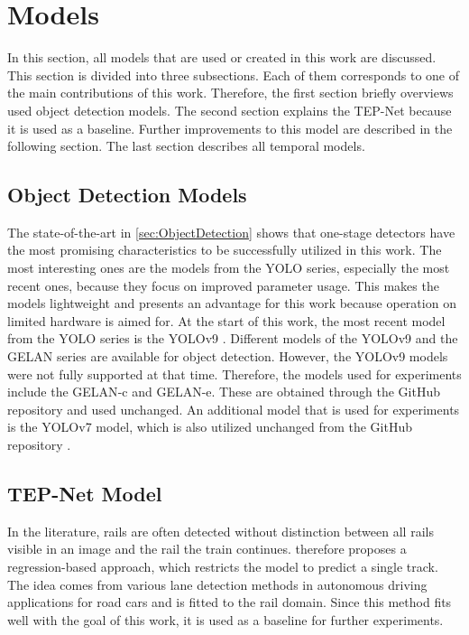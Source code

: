 \section{Models}
\label{sec:usedModels}

In this section, all models that are used or created in this work are discussed.
This section is divided into three subsections.
Each of them corresponds to one of the main contributions of this work.
Therefore, the first section briefly overviews used object detection models.
The second section explains the \ac{TEP}-Net \cite{tepNet2024} because it is used as a baseline.
Further improvements to this model are described in the following section.
The last section describes all temporal models.

\subsection{Object Detection Models}

The state-of-the-art in \autoref{sec:ObjectDetection} shows that one-stage detectors have the most promising characteristics to be successfully utilized in this work.
The most interesting ones are the models from the \ac{YOLO} series, especially the most recent ones, because they focus on improved parameter usage.
This makes the models lightweight and presents an advantage for this work because operation on limited hardware is aimed for.
At the start of this work, the most recent model from the \ac{YOLO} series is the \ac{YOLO}v9 \cite{YOLOv9}.
Different models of the \ac{YOLO}v9 and the \ac{GELAN} series are available for object detection.
However, the \ac{YOLO}v9 models were not fully supported at that time.
Therefore, the models used for experiments include the \ac{GELAN}-c and \ac{GELAN}-e.
These are obtained through the GitHub repository \cite{YOLOv9GitHub} and used unchanged.
An additional model that is used for experiments is the \ac{YOLO}v7 \cite{yolov7} model, which is also utilized unchanged from the GitHub repository \cite{YOLOv7GitHub}.

\subsection{TEP-Net Model}
\label{subsec:baselineModel}

In the literature, rails are often detected without distinction between all rails visible in an image and the rail the train continues.
\cite{tepNet2024} therefore proposes a regression-based approach, which restricts the model to predict a single track.
The idea comes from various lane detection methods in autonomous driving applications for road cars and is fitted to the rail domain.
Since this method fits well with the goal of this work, it is used as a baseline for further experiments.

